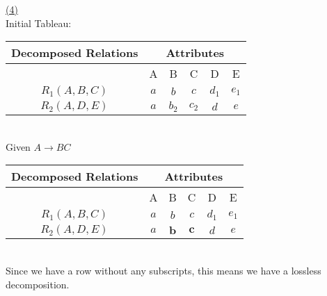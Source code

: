 \documentclass[12pt]{article}
\begin{document}
\noindent \hyperlink{toc}{\hypertarget{6.4}{(4)}}\\
Initial Tableau:\\[0.5cm]
\begin{tabular}{|c||c|c|c|c|c|}
    \hline
    {\cellcolor{gray!25}Decomposed Relations} & \multicolumn{5}{c|}{\cellcolor{gray!25}Attributes}                                 \\
    \hline
    \hline
    {\cellcolor{gray!25}}                     &
    {\cellcolor{gray!25}A}                    &
    {\cellcolor{gray!25}B}                    &
    {\cellcolor{gray!25}C}                    &
    {\cellcolor{gray!25}D}                    &
    {\cellcolor{gray!25}E}                                                                                                         \\
    \hline
    \hline
    $R_1 (A, B, C)$                           & $a$                                                & $b$   & $c$   & $d_1$ & $e_1$ \\
    \hline
    $R_2 (A, D, E)$                           & $a$                                                & $b_2$ & $c_2$ & $d$   & $e$   \\
    \hline
\end{tabular}\\[0.5cm]
Given $A \rightarrow BC$\\[0.5cm]
\begin{tabular}{|c||c|c|c|c|c|}
    \hline
    {\cellcolor{gray!25}Decomposed Relations} & \multicolumn{5}{c|}{\cellcolor{gray!25}Attributes}                                       \\
    \hline
    \hline
    {\cellcolor{gray!25}}                     &
    {\cellcolor{gray!25}A}                    &
    {\cellcolor{gray!25}B}                    &
    {\cellcolor{gray!25}C}                    &
    {\cellcolor{gray!25}D}                    &
    {\cellcolor{gray!25}E}                                                                                                               \\
    \hline
    \hline
    $R_1 (A, B, C)$                           & $a$                                                & $b$      & $c$      & $d_1$ & $e_1$ \\
    \hline
    $R_2 (A, D, E)$                           & $a$                                                & $\bm{b}$ & $\bm{c}$ & $d$   & $e$   \\
    \hline
\end{tabular}\\[0.5cm]
Since we have a row without any subscripts, this means we have a lossless decomposition.
\end{document}
